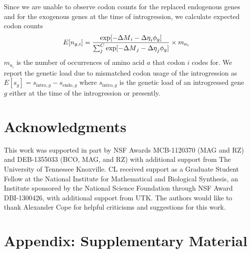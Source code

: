 Since we are unable to observe codon counts for the replaced endogenous genes and for the exogenous genes at the time of introgression, we calculate expected codon counts
\begin{equation}
E[n_{g,i}] = \frac{\exp[-{\Delta M}_i -{\Delta \eta}_i\phi_g]}{\sum_j^C \exp[-{\Delta M}_j -{\Delta \eta}_j\phi_g]}\times m_{a_i}
\end{equation} 
$m_{a_i}$ is the number of occurrences of amino acid $a$ that codon $i$ codes for.
We report the genetic load due to mismatched codon usage of the introgression as $E[s_g] = s_{\text{intro},g} - s_{\text{endo},g}$ where $s_{\text{intro},g}$ is the genetic load of an introgressed gene $g$ either at the time of the introgression or presently.

\section{Acknowledgments}

This work was supported in part by NSF Awards MCB-1120370 (MAG and RZ) and DEB-1355033 (BCO, MAG, and RZ) with additional support from The University of Tennessee Knoxville. 
CL received support as a Graduate Student Fellow at the National Institute for Mathematical and Biological Synthesis, an Institute sponsored by the National Science Foundation through NSF Award DBI-1300426, with additional support from UTK. 
The authors would like to thank Alexander Cope for helpful criticisms and suggestions for this work.


%
%

\clearpage
\pagebreak
\section{Appendix: Supplementary Material}


